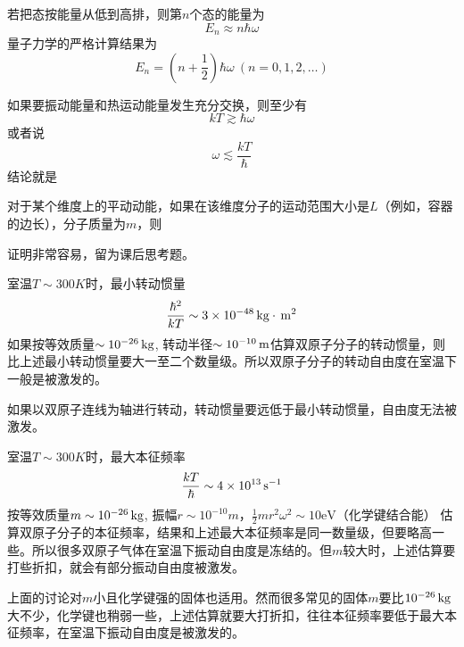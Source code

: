 \documentclass[CJK]{beamer}
\begin{document}
\begin{frame}
\bch
{\large
若把态按能量从低到高排，则第$n$个态的能量为
$$ E_n \approx  n\hbar\omega$$
量子力学的严格计算结果为
$$ E_n =  (n+\frac{1}{2})\hbar \omega \ (n = 0,1,2,\ldots)$$
}
\ech
\end{frame}

\begin{frame}
\bch
    {\large
      如果要振动能量和热运动能量发生充分交换，则至少有
$$kT \gtrsim \hbar \omega$$
或者说
$$\omega \lesssim \frac{kT}{\hbar}$$
结论就是
}
\ech
\end{frame}


\begin{frame}
\bch
{\large
对于某个维度上的平动动能，如果在该维度分子的运动范围大小是$L$（例如，容器的边长），分子质量为$m$，则

证明非常容易，留为课后思考题。}
\ech
\end{frame}



\begin{frame}
\bch
{室温$T\sim 300K$时，最小转动惯量
$$ \frac{\hbar^2}{kT} \sim 3 \times 10^{-48} \,\mathrm{kg}\cdot \,\mathrm{m}^2  $$
如果按等效质量$\sim 10^{-26}\,\mathrm{kg}$, 转动半径$\sim 10^{-10}\,\mathrm{m}$估算双原子分子的转动惯量，则比上述最小转动惯量要大一至二个数量级。所以{\blue 双原子分子的转动自由度在室温下一般是被激发的}。

\skipline

如果以双原子连线为轴进行转动，转动惯量要远低于最小转动惯量，自由度无法被激发。
}
\ech
\end{frame}


\begin{frame}
\bch
{室温$T\sim 300K$时，最大本征频率
$$ \frac{kT}{\hbar} \sim 4 \times 10^{13} \,\mathrm{s}^{-1}  $$
  按等效质量$m\sim 10^{-26}\,\mathrm{kg}$, 振幅$r\sim 10^{-10}m$，$\frac{1}{2}mr^2\omega^2\sim 10\mathrm{eV}$（化学键结合能） 估算双原子分子的本征频率，结果和上述最大本征频率是同一数量级，但要略高一些。所以{\blue 很多双原子气体在室温下振动自由度是冻结的}。但$m$较大时，上述估算要打些折扣，就会有部分振动自由度被激发。

  \skiplines
  
  上面的讨论对$m$小且化学键强的固体也适用。然而很多常见的固体$m$要比$10^{-26}\,\mathrm{kg}$大不少，化学键也稍弱一些，上述估算就要大打折扣，往往本征频率要低于最大本征频率，在室温下振动自由度是被激发的。
}

\ech
\end{frame}
\end{document}
